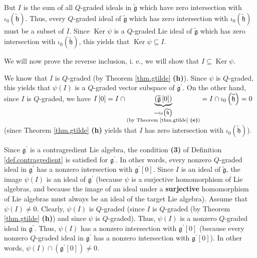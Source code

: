 \documentclass[etingof-lie.tex]{subfiles}
\begin{document}
But $I$ is the sum of all $Q$-graded ideals in $\widetilde{\mathfrak{g}}$
which have zero intersection with $\iota_{0}\left(  \widetilde{\mathfrak{h}%
}\right)  $. Thus, every $Q$-graded ideal of $\widetilde{\mathfrak{g}}$ which
has zero intersection with $\iota_{0}\left(  \widetilde{\mathfrak{h}}\right)
$ must be a subset of $I$. Since $\operatorname*{Ker}\psi$ is a $Q$-graded Lie
ideal of $\widetilde{\mathfrak{g}}$ which has zero intersection with
$\iota_{0}\left(  \widetilde{\mathfrak{h}}\right)  $, this yields that
$\operatorname*{Ker}\psi\subseteq I$.

We will now prove the reverse inclusion, i. e., we will show that
$I\subseteq\operatorname*{Ker}\psi$.

We know that $I$ is $Q$-graded (by Theorem \ref{thm.gtilde} \textbf{(h)}).
Since $\psi$ is $Q$-graded, this yields that $\psi\left(  I\right)  $ is a
$Q$-graded vector subspace of $\mathfrak{g}^{\prime}$. On the other hand,
since $I$ is $Q$-graded, we have $I\left[  0\right]  =I\cap\underbrace{\left(
\widetilde{\mathfrak{g}}\left[  0\right]  \right)  }_{\substack{=\iota
_{0}\left(  \widetilde{\mathfrak{h}}\right)  \\\text{(by Theorem
\ref{thm.gtilde} \textbf{(e)})}}}=I\cap\iota_{0}\left(
\widetilde{\mathfrak{h}}\right)  =0$ (since Theorem \ref{thm.gtilde}
\textbf{(h)} yields that $I$ has zero intersection with $\iota_{0}\left(
\widetilde{\mathfrak{h}}\right)  $).

Since $\mathfrak{g}^{\prime}$ is a contragredient Lie algebra, the condition
\textbf{(3)} of Definition \ref{def.contragredient} is satisfied for
$\mathfrak{g}^{\prime}$. In other words, every nonzero $Q$-graded ideal in
$\mathfrak{g}^{\prime}$ has a nonzero intersection with $\mathfrak{g}^{\prime
}\left[  0\right]  $. Since $I$ is an ideal of $\widetilde{\mathfrak{g}}$, the
image $\psi\left(  I\right)  $ is an ideal of $\mathfrak{g}^{\prime}$ (because
$\psi$ is a surjective homomorphism of Lie algebras, and because the image of
an ideal under a \textbf{surjective} homomorphism of Lie algebras must always
be an ideal of the target Lie algebra). Assume that $\psi\left(  I\right)
\neq0$. Clearly, $\psi\left(  I\right)  $ is $Q$-graded (since $I$ is
$Q$-graded (by Theorem \ref{thm.gtilde} \textbf{(h)}) and since $\psi$ is
$Q$-graded). Thus, $\psi\left(  I\right)  $ is a nonzero $Q$-graded ideal in
$\mathfrak{g}^{\prime}$. Thus, $\psi\left(  I\right)  $ has a nonzero
intersection with $\mathfrak{g}^{\prime}\left[  0\right]  $ (because every
nonzero $Q$-graded ideal in $\mathfrak{g}^{\prime}$ has a nonzero intersection
with $\mathfrak{g}^{\prime}\left[  0\right]  $). In other words, $\psi\left(
I\right)  \cap\left(  \mathfrak{g}^{\prime}\left[  0\right]  \right)  \neq0$.
\end{document}
